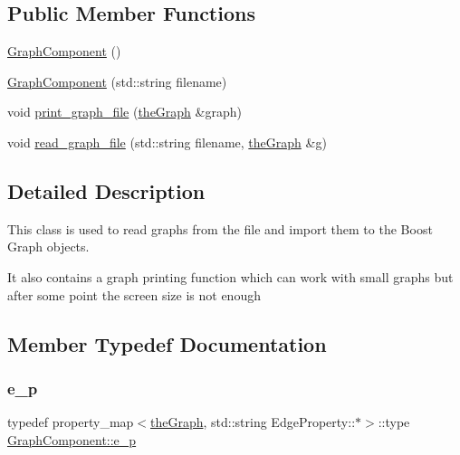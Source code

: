 \subsection*{Public Member Functions}
\begin{DoxyCompactItemize}
\item 
\hyperlink{class_graph_component_a35c4a6e5c6f28751b1bd6c451cc07957}{Graph\+Component} ()
\item 
\hyperlink{class_graph_component_a14482fdab4e309677b4a14ab8db13079}{Graph\+Component} (std\+::string filename)
\item 
void \hyperlink{class_graph_component_a6af293dac3774fde0e2822b5725ecacd}{print\+\_\+graph\+\_\+file} (\hyperlink{class_graph_component_a982e0748a6e1b8dc74986f5f8b3dca5c}{the\+Graph} \&graph)
\item 
void \hyperlink{class_graph_component_a680363eab8b992d739f055bd484bc000}{read\+\_\+graph\+\_\+file} (std\+::string filename, \hyperlink{class_graph_component_a982e0748a6e1b8dc74986f5f8b3dca5c}{the\+Graph} \&g)
\end{DoxyCompactItemize}


\subsection{Detailed Description}
This class is used to read graphs from the file and import them to the Boost Graph objects. 

It also contains a graph printing function which can work with small graphs but after some point the screen size is not enough 

\subsection{Member Typedef Documentation}
\mbox{\label{class_graph_component_a22292bf7520fb476958c508d66f5d318}} 
\subsubsection{\texorpdfstring{e\+\_\+p}{e\_p}}
{\footnotesize\ttfamily typedef property\+\_\+map$<$\hyperlink{class_graph_component_a982e0748a6e1b8dc74986f5f8b3dca5c}{the\+Graph}, std\+::string Edge\+Property\+::$\ast$$>$\+::type \hyperlink{class_graph_component_a22292bf7520fb476958c508d66f5d318}{Graph\+Component\+::e\+\_\+p}}

